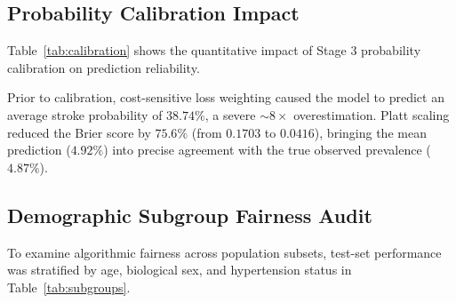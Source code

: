 \documentclass[conference]{IEEEtran}
\begin{document}
\subsection{Probability Calibration Impact}
Table~\ref{tab:calibration} shows the quantitative impact of Stage 3 probability calibration on prediction reliability.

\begin{table}[t]
\centering
\caption{Probability Calibration Reliability Analysis}
\label{tab:calibration}
\end{table}

Prior to calibration, cost-sensitive loss weighting caused the model to predict an average stroke probability of $38.74\%$, a severe $\sim 8\times$ overestimation. Platt scaling reduced the Brier score by \textbf{$75.6\%$} (from $0.1703$ to $0.0416$), bringing the mean prediction ($4.92\%$) into precise agreement with the true observed prevalence ($4.87\%$).

\subsection{Demographic Subgroup Fairness Audit}
To examine algorithmic fairness across population subsets, test-set performance was stratified by age, biological sex, and hypertension status in Table~\ref{tab:subgroups}.
\end{document}

